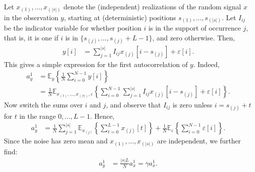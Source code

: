 \documentclass[12pt]{article}
\newcommand{\E}{\mathbb{E}}
\newcommand{\1}{\mathbf{1}}
\theoremstyle{plain}
\theoremstyle{definition}
\theoremstyle{remark}
\theoremstyle{plain}
\theoremstyle{remark}
\theoremstyle{plain}
\theoremstyle{plain}
\theoremstyle{plain}
\numberwithin{equation}{section}
\begin{document}
Let $x_{(1)}, \ldots, x_{(|s|)}$ denote the (independent) realizations of the random signal $x$ in the observation $y$, starting at (deterministic) positions $s_{(1)}, \ldots, s_{(|s|)}$. Let $I_{ij}$ be the indicator variable for whether position $i$ is in the support of occurrence $j$, that is, it is one if $i$ is in $\{s_{(j)}, \ldots, s_{(j)}+L-1\}$, and zero otherwise. Then,
\begin{align}
y[i] & = \sum_{j = 1}^{|s|} I_{ij} x_{(j)}[i-s_{(j)}] + \varepsilon[i].
\label{eq:explicityiindicators}
\end{align}
This gives a simple expression for the first autocorrelation of $y$. Indeed,
\begin{align}
a_y^1 & = \E_y\left\{ \frac{1}{N} \sum_{i = 0}^{N-1} y[i] \right\} \\
& = \frac{1}{N} \E_{x_{(1)}, \ldots, x_{(|s|)}, \varepsilon}\left\{ \sum_{i = 0}^{N-1} \sum_{j = 1}^{|s|} I_{ij} x_{(j)}[i-s_{(j)}] + \varepsilon[i] \right\}.
\end{align}
Now switch the sums over $i$ and $j$, and observe that $I_{ij}$ is zero unless $i = s_{(j)} + t$ for $t$ in the range $0, \ldots, L-1$. Hence,
\begin{align}
a_y^1 & = \frac{1}{N} \sum_{j = 1}^{|s|} \E_{x_{(j)}}\left\{ \sum_{t = 0}^{L-1} x_{(j)}[t]\right\} + \frac{1}{N} \E_\varepsilon\left\{ \sum_{i=0}^{N-1} \varepsilon[i]\right\}.
\end{align}
Since the noise has zero mean and $x_{(1)}, \ldots, x_{(|s|)}$ are independent, we further find:
\begin{align}
a_y^1 & = \frac{|s|L}{N} a_x^1 = \gamma a_x^1.
\end{align}
\end{document}
